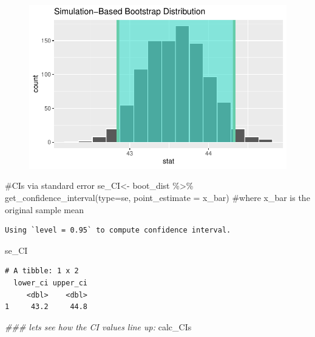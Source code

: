\documentclass[
  letterpaper,
  DIV=11,
  numbers=noendperiod]{scrartcl}
\newenvironment{Shaded}{\begin{snugshade}}{\end{snugshade}}
\newcommand{\AttributeTok}[1]{\textcolor[rgb]{0.40,0.45,0.13}{#1}}
\newcommand{\CommentTok}[1]{\textcolor[rgb]{0.37,0.37,0.37}{#1}}
\newcommand{\DocumentationTok}[1]{\textcolor[rgb]{0.37,0.37,0.37}{\textit{#1}}}
\newcommand{\FunctionTok}[1]{\textcolor[rgb]{0.28,0.35,0.67}{#1}}
\newcommand{\NormalTok}[1]{\textcolor[rgb]{0.00,0.23,0.31}{#1}}
\newcommand{\OtherTok}[1]{\textcolor[rgb]{0.00,0.23,0.31}{#1}}
\newcommand{\SpecialCharTok}[1]{\textcolor[rgb]{0.37,0.37,0.37}{#1}}
\newcommand{\StringTok}[1]{\textcolor[rgb]{0.13,0.47,0.30}{#1}}
\begin{document}
\begin{figure}[H]

{\centering \includegraphics{CIs_files/figure-pdf/unnamed-chunk-9-2.pdf}

}

\end{figure}

\begin{Shaded}
\begin{Highlighting}[]
\CommentTok{\#CIs via standard error}
\NormalTok{se\_CI}\OtherTok{\textless{}{-}}\NormalTok{ boot\_dist }\SpecialCharTok{\%\textgreater{}\%}
  \FunctionTok{get\_confidence\_interval}\NormalTok{(}\AttributeTok{type=}\StringTok{\textquotesingle{}se\textquotesingle{}}\NormalTok{, }\AttributeTok{point\_estimate =}\NormalTok{ x\_bar) }\CommentTok{\#where x\_bar is the original sample mean}
\end{Highlighting}
\end{Shaded}

\begin{verbatim}
Using `level = 0.95` to compute confidence interval.
\end{verbatim}

\begin{Shaded}
\begin{Highlighting}[]
\NormalTok{se\_CI}
\end{Highlighting}
\end{Shaded}

\begin{verbatim}
# A tibble: 1 x 2
  lower_ci upper_ci
     <dbl>    <dbl>
1     43.2     44.8
\end{verbatim}

\begin{Shaded}
\begin{Highlighting}[]
\DocumentationTok{\#\#\# let\textquotesingle{}s see how the CI values line up: }
\NormalTok{calc\_CIs}
\end{Highlighting}
\end{Shaded}
\end{document}
